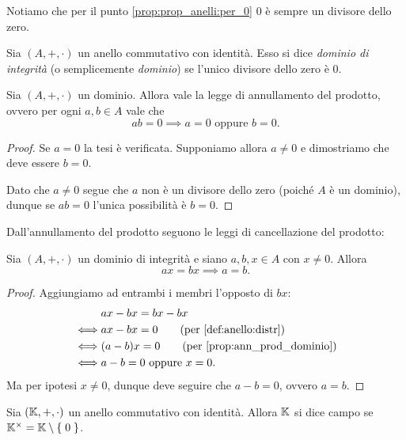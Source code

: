 \begin{remark}
    Notiamo che per il punto \ref{prop:prop_anelli:per_0} $0$ è sempre un divisore dello zero.
\end{remark}

\begin{definition}
    \label{def:dominio}
    Sia $(A, +, \cdot)$ un anello commutativo con identità. Esso si dice \emph{dominio di integrità} (o semplicemente \emph{dominio}) se l'unico divisore dello zero è $0$.
\end{definition}

\begin{proposition}
    \label{prop:ann_prod_dominio}
    Sia $(A, +, \cdot)$ un dominio. Allora vale la legge di annullamento del prodotto, ovvero per ogni $a, b \in A$ vale che \[
        ab = 0 \implies a = 0 \text{ oppure } b = 0.    
    \]
\end{proposition}
\begin{proof}
    Se $a = 0$ la tesi è verificata. Supponiamo allora $a \neq 0$ e dimostriamo che deve essere $b = 0$.

    Dato che $a \neq 0$ segue che $a$ non è un divisore dello zero (poiché $A$ è un dominio), dunque se $ab = 0$ l'unica possibilità è $b = 0$.
\end{proof}

Dall'annullamento del prodotto seguono le leggi di cancellazione del prodotto:
\begin{corollary}
    \label{cor:canc_prod_dominio}
    Sia $(A, +, \cdot)$ un dominio di integrità e siano $a, b, x \in A$ con $x \neq 0$. Allora \[
        ax = bx \implies a = b.    
    \]
\end{corollary}
\begin{proof}
    Aggiungiamo ad entrambi i membri l'opposto di $bx$: \begin{align*}
        &ax - bx = bx - bx\\
        \iff &ax - bx = 0 \tag{per \ref{def:anello:distr}}\\
        \iff &(a - b)x = 0 \tag{per \ref{prop:ann_prod_dominio}}\\
        \iff &a-b = 0 \text{ oppure } x = 0.
    \end{align*} Ma per ipotesi $x \neq 0$, dunque deve seguire che $a - b = 0$, ovvero $a = b$.
\end{proof}

\begin{definition}
    [Campo]
    Sia $(\mathbb{K}, +, \cdot)$ un anello commutativo con identità. Allora $\mathbb{K}$ si dice campo se $\mathbb{K}^{\times} = \mathbb{K} \setminus \left\{\;0\;\right\}$.
\end{definition}

